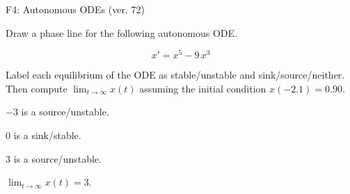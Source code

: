 \begin{exercise}
  \begin{exerciseTitle}F4: Autonomous ODEs (ver. 72)\end{exerciseTitle}
  \begin{exerciseStatement}
    

      Draw a phase line for the following 
      autonomous ODE.
    

    
\[x'= x^{5} - 9 \, x^{3}\]

    

      Label each equilibrium of the ODE
      as stable/unstable and sink/source/neither.
      Then compute \(\lim_{t\to\infty}x(t)\)
      assuming the initial condition
      \(x( -2.1 )= 0.90\).
    

  \end{exerciseStatement}
  \begin{exerciseAnswer}
    

      \(-3\) is a source/unstable.
      
        \(0\) is a sink/stable.
      
      \(3\) is a source/unstable.
    

    

      \(\lim_{t\to\infty}x(t)=3\).
    

  \end{exerciseAnswer}
\end{exercise}